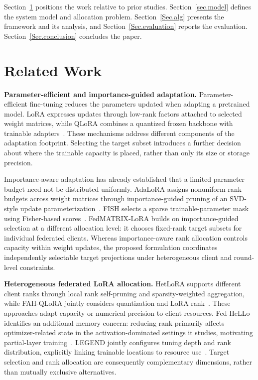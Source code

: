 \documentclass[10pt,conference,letterpaper]{IEEEtran}
\begin{document}
Section~\ref{Sec.relatedworks} positions the work relative to prior studies. Section~\ref{sec.model} defines the system model and allocation problem. Section~\ref{Sec.alg} presents the framework and its analysis, and Section~\ref{Sec.evaluation} reports the evaluation. Section~\ref{Sec.conclusion} concludes the paper.

\section{Related Work}\label{Sec.relatedworks}
\noindent\textbf{Parameter-efficient and importance-guided adaptation.}
Parameter-efficient fine-tuning reduces the parameters updated when adapting a pretrained model. LoRA expresses updates through low-rank factors attached to selected weight matrices, while QLoRA combines a quantized frozen backbone with trainable adapters~\cite{hu2022lora,dettmers2023qlora}. These mechanisms address different components of the adaptation footprint. Selecting the target subset introduces a further decision about where the trainable capacity is placed, rather than only its size or storage precision.

Importance-aware adaptation has already established that a limited parameter budget need not be distributed uniformly. AdaLoRA assigns nonuniform rank budgets across weight matrices through importance-guided pruning of an SVD-style update parameterization~\cite{fm_adalora2023}. FISH selects a sparse trainable-parameter mask using Fisher-based scores~\cite{fm_fish2021}. FedMATRIX-LoRA builds on importance-guided selection at a different allocation level: it chooses fixed-rank target subsets for individual federated clients. Whereas importance-aware rank allocation controls capacity within weight updates, the proposed formulation coordinates independently selectable target projections under heterogeneous client and round-level constraints.

\noindent\textbf{Heterogeneous federated LoRA allocation.}
HetLoRA supports different client ranks through local rank self-pruning and sparsity-weighted aggregation, while FAH-QLoRA jointly considers quantization and LoRA rank~\cite{cho2024hetlora,gao2025fah}. These approaches adapt capacity or numerical precision to client resources. Fed-HeLLo identifies an additional memory concern: reducing rank primarily affects optimizer-related state in the activation-dominated settings it studies, motivating partial-layer training~\cite{zhang2025fedhello}. LEGEND jointly configures tuning depth and rank distribution, explicitly linking trainable locations to resource use~\cite{liu2025legend}. Target selection and rank allocation are consequently complementary dimensions, rather than mutually exclusive alternatives.
\end{document}
